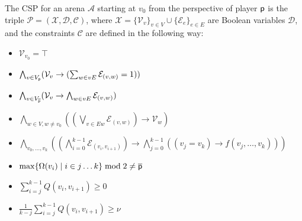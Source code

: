 \documentclass[a4paper,UKenglish,cleveref, autoref, thm-restate, anonymous]{lipics-v2021}
\begin{document}
\begin{definition}\label{def:csp}
    The CSP for an arena $\mathcal{A}$
    starting at $v_0$ from the perspective of player $\mathsf{p}$ is the triple $\mathcal{P} = (\mathcal{X}, \mathcal{D}, \mathcal{C})$, where $\mathcal{X} = \{ \mathcal{V}_v \}_{v \in V} \cup \{ \mathcal{E}_e \}_{e \in E}$ are Boolean variables $\mathcal{D}$, and the constraints $\mathcal{C}$ are defined in the following way:
    \begin{itemize}
        [leftmargin=3.3cm, labelwidth=2.8cm, align=right, itemsep=0.2ex, parsep=0pt, topsep=2pt]

        \item [$\mathcal{C}_{v_0}$ :] $\mathcal{V}_{v_0} = \top$

        \item [$\mathcal{C}_{\player}$ :] $\bigwedge_{v \in V_{\mathsf{p}}} (\mathcal{V}_v \rightarrow (\sum_{w \in vE} \mathcal{E}_{(v,w)}= 1))$

        \item [$\mathcal{C}_{\opponent}$ :] $\bigwedge_{v \in V_{\overline{\mathsf{p}}}} (\mathcal{V}_v \rightarrow \bigwedge_{w \in vE} \mathcal{E}_{(v,w)})$

        \item [$\mathcal{C}_{\!E}$ :] $\bigwedge_{w \in V, w \neq v_0} ((\bigvee_{v \in Ew} \mathcal{E}_{(v,w)}) \rightarrow \mathcal{V}_w)$

        \item [$\mathcal{C}_{NOC}(f)$ :] $\bigwedge_{v_0, \dots, v_k} \left( \left(\bigwedge_{i=0}^{k-1} \mathcal{E}_{(v_i,v_{i+1})}\right) \to \bigwedge_{j=0}^{k-1} ((v_j = v_k) \to f(v_j, \dots, v_k)) \right)$

    \end{itemize}
    \begin{itemize}
        [leftmargin=3.3cm, labelwidth=2.8cm, align=right, itemsep=0.5ex, parsep=0pt, topsep=1pt]
        \item [$f_\omega(v_j, \dots, v_k) =$] $\max\{\Omega(v_i) \mid i\in j\dots k\} \bmod 2 \ne \overline{\mathsf{p}}$

        \item [$f_\eta(v_j, \dots, v_k) =$] $\sum_{i=j}^{k-1} Q(v_i, v_{i+1}) \ge 0$

        \item [$f_\mu(v_j, \dots, v_k) =$] $\frac{1}{k-j} \sum_{i=j}^{k-1} Q(v_i, v_{i+1}) \ge \nu$
    \end{itemize}
\end{definition}
\end{document}
